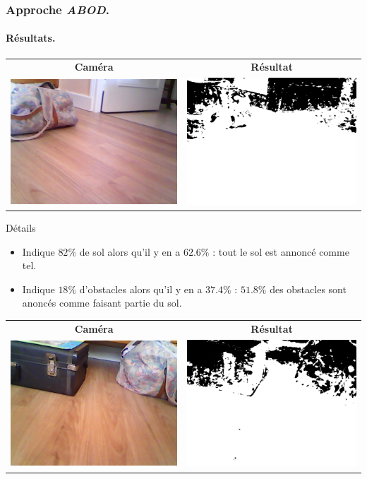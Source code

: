 \begin{frame}
    \frametitle{Approche \emph{ABOD}.}
    \framesubtitle{Résultats.}
    \begin{center}
         {
            \begin{tabular}{cc}
                \textbf{Caméra} & \textbf{Résultat} \\
                \includegraphics[width=0.4\linewidth]{rcs/abodr0s.png} & \includegraphics[width=0.4\linewidth]{rcs/abodr0r.png} \\
            \end{tabular}
            \begin{block}{Détails}
                \begin{itemize}
                    \item Indique $82\%$ de sol alors qu'il y en a $62.6\%$ : tout le sol est annoncé comme tel.
                    \item Indique $18\%$ d'obstacles alors qu'il y en a $37.4\%$ : $51.8\%$ des obstacles sont anoncés comme faisant partie du sol.
                \end{itemize}
            \end{block}
        }  {
            \begin{tabular}{cc}
                \textbf{Caméra} & \textbf{Résultat} \\
                \includegraphics[width=0.4\linewidth]{rcs/abodr1s.png} & \includegraphics[width=0.4\linewidth]{rcs/abodr1r.png} \\

\end{tabular}}
\end{center}
\end{frame}
